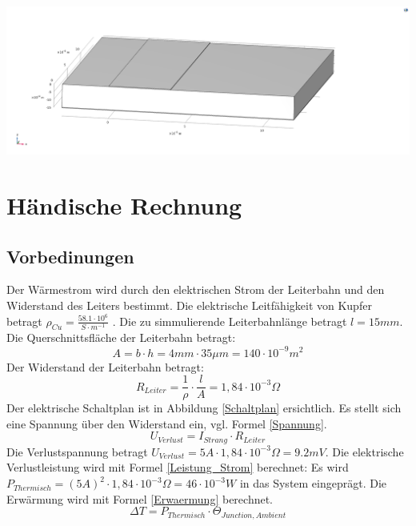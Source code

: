 \documentclass[10pt,a4paper,oneside,abstracton]{scrartcl}
\newenvironment{Figure}
  {\par\medskip\noindent\minipage{\linewidth}}
  {\endminipage\par\medskip}
\begin{document}
\begin{multicols}{2}
\begin{Figure}
	\includegraphics[width=\textwidth]{Bilder/Geometrie.png}
	\label{geometry}
\end{Figure}


\section{Händische Rechnung}
\subsection{Vorbedinungen}
Der Wärmestrom wird durch den elektrischen Strom der Leiterbahn und den Widerstand des Leiters bestimmt. 
\newline
Die elektrische Leitfähigkeit von Kupfer betragt 
\newline
$ \rho_{Cu} = \frac{58.1\cdot 10^6}{S \cdot m^{-1}} $ \cite{Waermefluss}.
\newline
Die zu simmulierende Leiterbahnlänge betragt
\newline
 $l = 15 mm$.
\newline
Die Querschnittsfläche der Leiterbahn betragt: 
\begin{equation}
	A = b \cdot h = 4 mm \cdot 35 \mu m = 140 \cdot 10 ^{-9} m^2
\end{equation}
Der Widerstand der Leiterbahn betragt: 
\begin{equation}
	R_{Leiter} = \frac{1}{\rho} \cdot \frac{l}{A} = 1,84 \cdot 10^{-3} \Omega
\end{equation}
\noindent
Der elektrische Schaltplan ist in Abbildung \ref*{Schaltplan} ersichtlich.  \newline
Es stellt sich eine Spannung über den Widerstand ein, vgl. Formel \ref*{Spannung}. 
\begin{equation}
	U_{Verlust} =  I_{Strang} \cdot R_{Leiter}
	\label{Spannung}
\end{equation}
\noindent
Die Verlustspannung betragt $U_{Verlust} = 5A \cdot 1,84 \cdot 10^{-3} \Omega = 9.2 mV$. 
Die elektrische Verlustleistung wird mit Formel \ref*{Leistung_Strom} berechnet: 
Es wird
$ P_{Thermisch} = (5A)^2 \cdot 1,84 \cdot 10^{-3} \Omega = 46 \cdot 10^{-3} W $ 
in das System eingeprägt.
Die Erwärmung wird mit Formel \ref*{Erwaermung} berechnet.
\begin{equation}
	\Delta T = P_{Thermisch} \cdot \Theta_{Junction, Ambient}
	\label{Erwaermung}
\end{equation}


\end{multicols}
\end{document}
